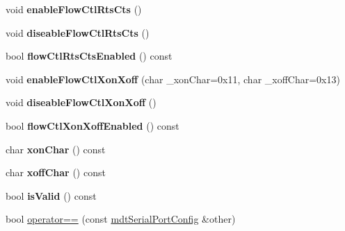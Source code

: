 \begin{DoxyCompactItemize}
\item 
\hypertarget{classmdt_serial_port_config_accac127fab319e881a0461f76a97362c}{
void {\bfseries enableFlowCtlRtsCts} ()}
\label{classmdt_serial_port_config_accac127fab319e881a0461f76a97362c}

\item 
\hypertarget{classmdt_serial_port_config_a5f0af023613beabc6aeb527b280ae5c2}{
void {\bfseries diseableFlowCtlRtsCts} ()}
\label{classmdt_serial_port_config_a5f0af023613beabc6aeb527b280ae5c2}

\item 
\hypertarget{classmdt_serial_port_config_a7d57e9d14db59ba8d723daefbb2ad551}{
bool {\bfseries flowCtlRtsCtsEnabled} () const }
\label{classmdt_serial_port_config_a7d57e9d14db59ba8d723daefbb2ad551}

\item 
\hypertarget{classmdt_serial_port_config_aff4d979dc07061dd7ddaba01a08e39e2}{
void {\bfseries enableFlowCtlXonXoff} (char \_\-xonChar=0x11, char \_\-xoffChar=0x13)}
\label{classmdt_serial_port_config_aff4d979dc07061dd7ddaba01a08e39e2}

\item 
\hypertarget{classmdt_serial_port_config_a1ae8683186b22de6cb1faa23191c1403}{
void {\bfseries diseableFlowCtlXonXoff} ()}
\label{classmdt_serial_port_config_a1ae8683186b22de6cb1faa23191c1403}

\item 
\hypertarget{classmdt_serial_port_config_aab953b67c1cc653f42aa1e439a5f586a}{
bool {\bfseries flowCtlXonXoffEnabled} () const }
\label{classmdt_serial_port_config_aab953b67c1cc653f42aa1e439a5f586a}

\item 
\hypertarget{classmdt_serial_port_config_a8c86f4dc3114dbd9f4e45d4fd6477b2c}{
char {\bfseries xonChar} () const }
\label{classmdt_serial_port_config_a8c86f4dc3114dbd9f4e45d4fd6477b2c}

\item 
\hypertarget{classmdt_serial_port_config_a1ddd8b2b446f709d8d500a5be77d9584}{
char {\bfseries xoffChar} () const }
\label{classmdt_serial_port_config_a1ddd8b2b446f709d8d500a5be77d9584}

\item 
\hypertarget{classmdt_serial_port_config_ab450b1a53c5b2686bd979d42aabb323f}{
bool {\bfseries isValid} () const }
\label{classmdt_serial_port_config_ab450b1a53c5b2686bd979d42aabb323f}

\item 
\hypertarget{classmdt_serial_port_config_a31680194276513004e91cd3bee85a398}{
bool \hyperlink{classmdt_serial_port_config_a31680194276513004e91cd3bee85a398}{operator==} (const \hyperlink{classmdt_serial_port_config}{mdtSerialPortConfig} \&other)}
\label{classmdt_serial_port_config_a31680194276513004e91cd3bee85a398}


\end{DoxyCompactItemize}
